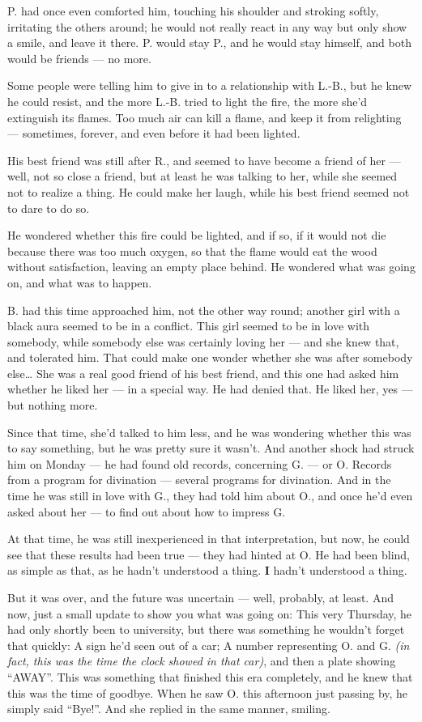 P. had once even comforted him, touching his shoulder and stroking softly, irritating the others around; he would not really react in any way but only show a smile, and leave it there. P. would stay P., and he would stay himself, and both would be friends --- no more.

Some people were telling him to give in to a relationship with L.-B., but he knew he could resist, and the more L.-B. tried to light the fire, the more she'd extinguish its flames. Too much air can kill a flame, and keep it from relighting --- sometimes, forever, and even before it had been lighted.

His best friend was still after R., and seemed to have become a friend of her --- well, not so close a friend, but at least he was talking to her, while she seemed not to realize a thing. He could make her laugh, while his best friend seemed not to dare to do so.

He wondered whether this fire could be lighted, and if so, if it would not die because there was too much oxygen, so that the flame would eat the wood without satisfaction, leaving an empty place behind. 
He wondered what was going on, and what was to happen.

B. had this time approached him, not the other way round; another girl with a black aura seemed to be in a conflict. This girl seemed to be in love with somebody, while somebody else was certainly loving her --- and she knew that, and tolerated him. That could make one wonder whether she was after somebody else\ldots
She was a real good friend of his best friend, and this one had asked him whether he liked her --- in a special way. 
He had denied that. He liked her, yes --- but nothing more.

Since that time, she'd talked to him less, and he was wondering whether this was to say something, but he was pretty sure it wasn't. 
And another shock had struck him on Monday --- he had found old records, concerning G. --- or O. Records from a program for divination --- several programs for divination. And in the time he was still in love with G., they had told him about O., and once he'd even asked about her --- to find out about how to impress G.

At that time, he was still inexperienced in that interpretation, but now, he could see that these results had been true --- they had hinted at O. 
He had been blind, as simple as that, as he hadn't understood a thing. 
\textbf{I} hadn't understood a thing.

But it was over, and the future was uncertain --- well, probably, at least. 
And now, just a small update to show you what was going on: This very Thursday, he had only shortly been to university, but there was something he wouldn't forget that quickly: A sign he'd seen out of a car; A number representing O. and G. \emph{(in fact, this was the time the clock showed in that car)}, and then a plate showing \enquote{AWAY}. This was something that finished this era completely, and he knew that this was the time of goodbye. When he saw O. this afternoon just passing by, he simply said \enquote{Bye!}. 
And she replied in the same manner, smiling.

